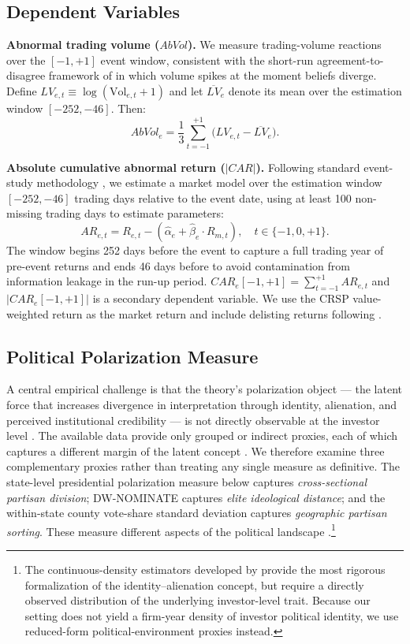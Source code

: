 \documentclass[12pt]{article}
\begin{document}


\subsection{Dependent Variables}

\textbf{Abnormal trading volume ($AbVol$).} We measure trading-volume
reactions over the $[-1, +1]$ event window, consistent with the short-run
agreement-to-disagree framework of \citet{kandel1995} in which volume spikes
at the moment beliefs diverge. Define $LV_{e,t} \equiv \log(\mathrm{Vol}_{e,t}+1)$
and let $\overline{LV}_e$ denote its mean over the estimation window
$[-252, -46]$. Then:
\[
    AbVol_e = \frac{1}{3}\sum_{t=-1}^{+1}\bigl(LV_{e,t} - \overline{LV}_e\bigr).
\]

\textbf{Absolute cumulative abnormal return ($|CAR|$).} Following standard
event-study methodology \citep{mackinlay1997}, we estimate a market model
over the estimation window $[-252, -46]$ trading days relative to the event
date, using at least 100 non-missing trading days to estimate parameters:
\begin{equation}
    AR_{e,t} = R_{e,t} - (\hat{\alpha}_e + \hat{\beta}_e \cdot R_{m,t}),
    \quad t \in \{-1, 0, +1\}.
\end{equation}
The window begins 252 days before the event to capture a full trading year
of pre-event returns and ends 46 days before to avoid contamination from
information leakage in the run-up period. $CAR_e[-1,+1] = \sum_{t=-1}^{+1} AR_{e,t}$
and $|CAR_e[-1,+1]|$ is a secondary dependent variable. We use the CRSP
value-weighted return as the market return and include delisting returns
following \citet{beaver2007}.

\subsection{Political Polarization Measure}

A central empirical challenge is that the theory's polarization object ---
the latent force that increases divergence in interpretation through identity,
alienation, and perceived institutional credibility --- is not directly
observable at the investor level \citep{duclos2004}. The available data
provide only grouped or indirect proxies, each of which captures a different
margin of the latent concept \citep{esteban1994, esteban2007}. We therefore examine three
complementary proxies rather than treating any single measure as definitive.
The state-level presidential polarization measure below captures
\emph{cross-sectional partisan division}; DW-NOMINATE captures
\emph{elite ideological distance}; and the within-state county vote-share
standard deviation captures \emph{geographic partisan sorting}. These measure different aspects of the
political landscape \citep{wang2000}.\footnote{%
The continuous-density estimators developed by \citet{duclos2004} provide
the most rigorous formalization of the identity--alienation concept, but
require a directly observed distribution of the underlying investor-level
trait. Because our setting does not yield a firm-year density of investor
political identity, we use reduced-form political-environment proxies instead.}
\end{document}
